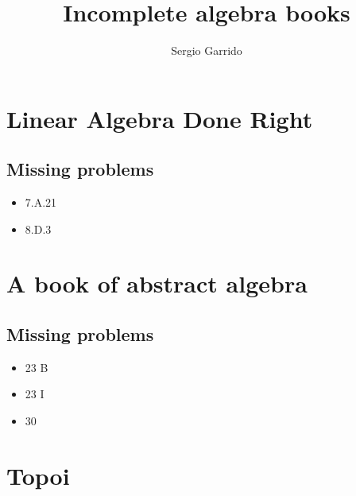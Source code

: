 \documentclass{bookSolutions}
\title{Incomplete algebra books}
\author{Sergio Garrido}
\begin{document}
\tableofcontents
\newpage

\section{Linear Algebra Done Right}
\subsection{Missing problems}
\begin{itemize}
    \item 7.A.21
    \item 8.D.3
\end{itemize}

























\newpage
\section{A book of abstract algebra}
\subsection{Missing problems}
\begin{itemize}
    \item 23 B
    \item 23 I
    \item 30
\end{itemize}


















\newpage
\section{Topoi}

\end{document}
